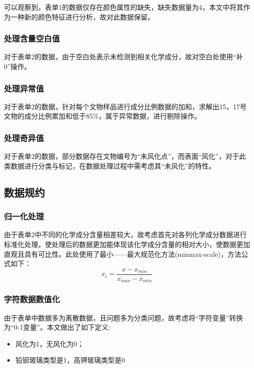 \documentclass[withoutpreface,bwprint]{cumcmthesis} %
\begin{document}
可以观察到，表单1的数据仅存在颜色属性的缺失，缺失数据量为4，本文中将其作为一种新的颜色特征进行分析，故对此数据保留。


\subsubsection{处理含量空白值}

对于表单2的数据，由于空白处表示未检测到相关化学成分，故对空白处使用“补0”操作。

\subsubsection{处理异常值}

对于表单2的数据，针对每个文物样品进行成分比例数据的加和，求解出15，17号文物的成分比例累加和低于85\%，属于异常数据，进行剔除操作。

\subsubsection{处理奇异值}

对于表单2的数据，部分数据存在文物编号为“未风化点”，而表面“风化”，对于此类数据进行分类与标记，在数据处理过程中需考虑其“未风化”的特性。


\subsection{数据规约}
\subsubsection{归一化处理}
由于表单2中不同的化学成分含量相差较大，故考虑首先对各列化学成分数据进行标准化处理，使处理后的数据更加能体现该化学成分含量的相对大小，使数据更加直观且具有可比性。此处使用了最小——最大规范化方法(minmax-scale)，方法公式如下： $$ x_{i} = \frac{x-x_{min}}{x_{max}-x_{min}}$$

\subsubsection{字符数据数值化}

由于表单中数据多为离散数据，且问题多为分类问题，故考虑将“字符变量”转换为“0-1变量”。本文做出了如下定义:

\begin{itemize}
	\item 风化为1，无风化为0；
	\item 铅钡玻璃类型是1，高钾玻璃类型是0
\end{itemize}
\end{document}

